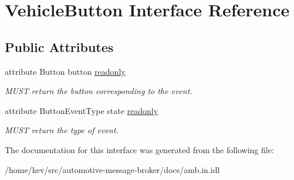 \hypertarget{interfaceVehicleButton}{\section{Vehicle\+Button Interface Reference}
\label{interfaceVehicleButton}
}
\subsection*{Public Attributes}
\begin{DoxyCompactItemize}
\item 
\hypertarget{interfaceVehicleButton_a3fcf5461601cd21878fdd3ee1cfd9ef9}{attribute Button button \hyperlink{interfaceVehicleButton_a3fcf5461601cd21878fdd3ee1cfd9ef9}{readonly}}\label{interfaceVehicleButton_a3fcf5461601cd21878fdd3ee1cfd9ef9}

\begin{DoxyCompactList}\small\item\em M\+U\+S\+T return the button corresponding to the event. \end{DoxyCompactList}\item 
\hypertarget{interfaceVehicleButton_aa32792123136658d315c5c61e54f5bf0}{attribute Button\+Event\+Type state \hyperlink{interfaceVehicleButton_aa32792123136658d315c5c61e54f5bf0}{readonly}}\label{interfaceVehicleButton_aa32792123136658d315c5c61e54f5bf0}

\begin{DoxyCompactList}\small\item\em M\+U\+S\+T return the type of event. \end{DoxyCompactList}\end{DoxyCompactItemize}


The documentation for this interface was generated from the following file\+:\begin{DoxyCompactItemize}
\item 
/home/kev/src/automotive-\/message-\/broker/docs/amb.\+in.\+idl\end{DoxyCompactItemize}

